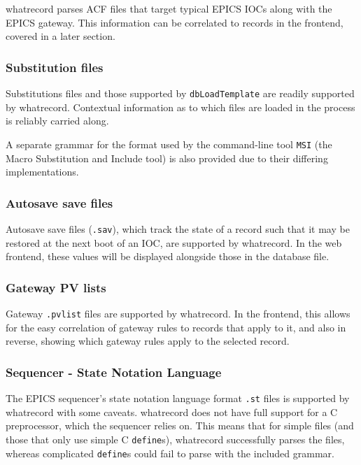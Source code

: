 \documentclass[letter,
               keeplastbox,   %
               ]{jacow}
\begin{document}
whatrecord parses ACF files that target typical EPICS IOCs along with
the EPICS gateway.  This information can be correlated to records in the
frontend, covered in a later section.

\subsubsection{Substitution files}

Substitutions files and those supported by \verb_dbLoadTemplate_ are
readily supported by whatrecord.  Contextual information as to which
files are loaded in the process is reliably carried along.

A separate grammar for the format used by the command-line tool \verb_MSI_ (the
Macro Substitution and Include tool) is also provided due to their
differing implementations.

\subsubsection{Autosave save files}

Autosave save files (\verb_.sav_), which track the state of a record such that
it may be restored at the next boot of an IOC, are supported by whatrecord.
In the web frontend, these values will be displayed alongside those in the
database file.

\subsubsection{Gateway PV lists}

Gateway \verb_.pvlist_ files are supported by whatrecord.  In the frontend,
this allows for the easy correlation of gateway rules to records that
apply to it, and also in reverse, showing which gateway rules apply to
the selected record.

\subsubsection{Sequencer - State Notation Language}

The EPICS sequencer's state notation language format \verb_.st_ files is
supported by whatrecord with some caveats.  whatrecord does not have full
support for a C preprocessor, which the sequencer relies on.  This means
that for simple files (and those that only use simple C \verb_define_s), whatrecord
successfully parses the files, whereas complicated \verb_define_s could fail
to parse with the included grammar.
\end{document}
